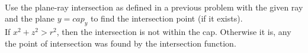 \documentclass[10pt,twocolumn]{article}
\begin{document}
\begin{framed}
 \\

Use the plane-ray intersection as defined in a previous problem with the given ray and the plane $y = cap_y$ to find the intersection point (if it exists).\\


If $x^2 + z^2 > r^2$, then the intersection is not within the cap. Otherwise it is, any the point of intersection was found by the intersection function.

\end{framed}


\end{document}
